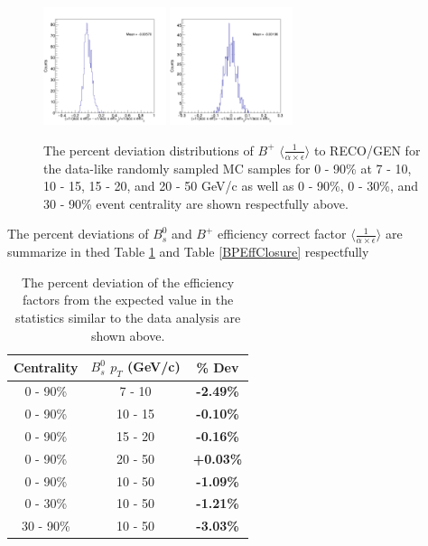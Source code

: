 \begin{figure}[h]
\begin{center}
\includegraphics[width= 0.32\textwidth]{Figures/Chapter5/BPEffONLY_30_90_-1.png}
\includegraphics[width= 0.32\textwidth]{Figures/Chapter5/BPEffONLY_0_90_-1.png} 
\caption{The percent deviation distributions of $B^+$ $\langle \frac{1}{\alpha \times \epsilon}\rangle$ to RECO/GEN for the data-like randomly sampled MC samples for 0 - 90\% at 7 - 10, 10 - 15, 15 - 20, and 20 - 50 GeV/c as well as 0 - 90\%, 0 - 30\%, and 30 - 90\% event centrality are shown respectfully above.} 
\label{BPLowStatFig} 
\end{center}
\end{figure}



The percent deviations of $B^0_s$ and $B^+$ efficiency correct factor $\langle \frac{1}{\alpha \times \epsilon}\rangle$ are summarize in thed Table \ref{BsEffClosure} and Table \ref{BPEffClosure} respectfully


\begin{table}[h]
\begin{center}
\caption{The percent deviation of the efficiency factors from the expected value in the statistics similar to the data analysis are shown above.}
\vspace{1em}
\label{BsEffClosure}
  \begin{tabular}{| c | c |c |}
    \hline
     Centrality &   $B^0_s$  $p_T$ (GeV/c) &   \% Dev \\
    \hline
    \hline
0 - 90\% & 7 - 10 &  \textbf{-2.49\% }   \\ 
0 - 90\% & 10 - 15 &  \textbf{-0.10\% }   \\ 
0 - 90\% & 15 - 20 &   \textbf{-0.16\% }   \\ 
0 - 90\% & 20 - 50 &  \textbf{+0.03\% }   \\ 
0 - 90\% & 10 - 50 &  \textbf{-1.09\% }   \\ 
0 - 30\% & 10 - 50 &   \textbf{-1.21\% }   \\ 
30 - 90\% & 10 - 50 & \textbf{-3.03\% }   \\ 
    \hline
    \hline
\end{tabular}
\end{center}
\end{table}

